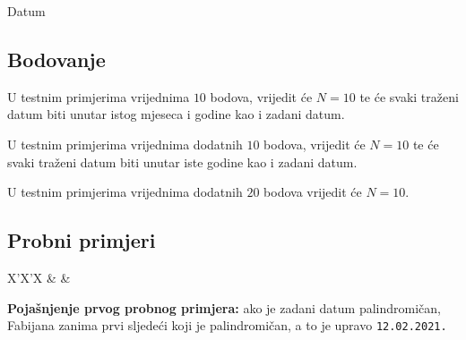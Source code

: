 \begin{statement}[
  problempoints=50,
  timelimit=1 sekunda,
  memorylimit=512 MiB,
]{Datum}
\subsection*{Bodovanje}
U testnim primjerima vrijednima $10$ bodova, vrijedit će $N=10$ te će svaki traženi
datum biti unutar istog mjeseca i godine kao i zadani datum.

U testnim primjerima vrijednima dodatnih $10$ bodova, vrijedit će $N=10$ te će svaki
traženi datum biti unutar iste godine kao i zadani datum.

U testnim primjerima vrijednima dodatnih $20$ bodova vrijedit će $N=10$.

\subsection*{Probni primjeri}
\begin{tabularx}{\textwidth}{X'X'X}
 &
 &
\end{tabularx}

\textbf{Pojašnjenje prvog probnog primjera:}
ako je zadani datum palindromičan, Fabijana zanima prvi sljedeći koji je
palindromičan, a to je upravo \texttt{12.02.2021.}


\end{statement}

